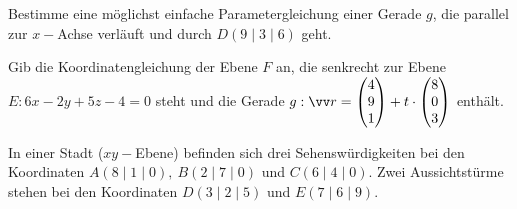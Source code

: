 \documentclass[11pt]{exam}
\begin{document}
\newpage
\begin{questions}
\question[2] %
Bestimme eine möglichst einfache Parametergleichung einer Gerade $g$, die parallel zur $x-$Achse verläuft und durch $D(9\mid3\mid6)$ geht.
\vspace{7pt}

\question[3] %
Gib die Koordinatengleichung der Ebene $F$ an, die senkrecht zur Ebene\\ ${E:6x-2y+5z-4=0}$ steht und die Gerade $g:\v{r}=\Vec{4}{9}{1}+t\*\Vec{8}{0}{3}$ enthält.


\newpage
\noaddpoints
\question[\totalpoints]
\addpoints
{}
\vspace{7pt}


\newpage
\noaddpoints
\question[\totalpoints]
\addpoints
In einer Stadt ($xy-$Ebene) befinden sich drei Sehenswürdigkeiten bei den Koordinaten $A(8\mid1\mid0),\: B(2\mid7\mid0)$ und $C(6\mid4\mid0)$. Zwei Aussichtstürme stehen bei den Koordinaten $D(3\mid2\mid5)$ und $E(7\mid6\mid9)$.
\vspace{7pt}



\end{questions}
\end{document}

